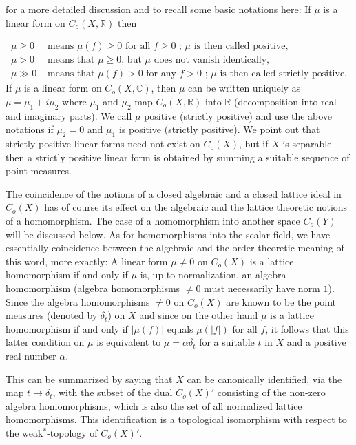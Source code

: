 \newpage

for a more detailed discussion and to recall some basic notations here: If $\mu$ is a linear form on $C_{o}(X,\mathbb{R})$ then

\[
\begin{aligned}
	\mu \geq 0 &\text{ means } \mu(f) \geq 0 \text{ for all } f \geq 0 \text{ ; } \mu \text{ is then called positive}, \\
	\mu > 0 &\text{ means that } \mu \geq 0 \text{, but } \mu \text{ does not vanish identically}, \\
	\mu \gg 0 &\text{ means that } \mu(f) > 0 \text{ for any } f > 0 \text{ ; } \mu \text{ is then called strictly positive}.
\end{aligned}
\]
If $\mu$ is a linear form on $C_{o}(X,\mathbb{C})$, then $\mu$ can be written uniquely as $\mu = \mu_{1} + i\mu_{2}$ where $\mu_{1}$ and $\mu_{2}$ map $C_{o}(X,\mathbb{R})$ into $\mathbb{R}$ (decomposition into real and imaginary parts).
We call $\mu$ positive (strictly positive) and use the above notations if $\mu_{2} = 0$ and $\mu_{1}$ is positive (strictly positive).
We point out that strictly positive linear forms need not exist on $C_{o}(X)$, but if $X$ is separable then a strictly positive linear form is obtained by summing a suitable sequence of point measures.

The coincidence of the notions of a closed algebraic and a closed lattice ideal in $C_{o}(X)$ has of course its effect on the algebraic and the lattice theoretic notions of a homomorphism.
The case of a homomorphism into another space $C_{o}(Y)$ will be discussed below.
As for homomorphisms into the scalar field, we have essentially coincidence between the algebraic and the order theoretic meaning of this word, more exactly: A linear form $\mu \neq 0$ on $C_{o}(X)$ is a lattice homomorphism if and only if $\mu$ is, up to normalization, an algebra homomorphism (algebra homomorphisms $\neq 0$ must necessarily have norm $1$).
Since the algebra homomorphisms $\neq 0$ on $C_{o}(X)$ are known to be the point measures (denoted by $\delta_{t}$) on $X$ and since on the other hand $\mu$ is a lattice homomorphism if and only if $|\mu(f)|$ equals $\mu(|f|)$ for all $f$, it follows that this latter condition on $\mu$ is equivalent to $\mu = \alpha\delta_{t}$ for a suitable $t$ in $X$ and a positive real number $\alpha$.

This can be summarized by saying that $X$ can be canonically identified, via the map $t \to \delta_{t}$, with the subset of the dual $C_{o}(X)'$ consisting of the non-zero algebra homomorphisms, which is also the set of all normalized lattice homomorphisms.
This identification is a topological isomorphism with respect to the weak$^{*}$-topology of $C_{o}(X)'$.

